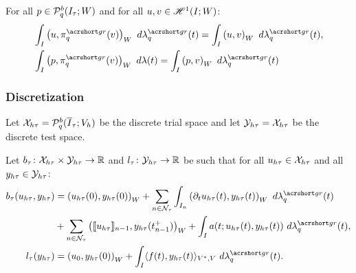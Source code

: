 \begin{proposition}
    For all $p \in \mathcal{P}_{q}^b(I_{\tau}; W)$ and for all $u, v \in \mathscr{H}^{1}(I; W)$:
    \begin{align}
        & \int_I \left( u, \InterpolantGR_q(v) \right)_W ~ d \lambdaGR_q(t) = \int_I \left( u, v \right)_W ~ d \lambdaGR_q(t), \\
        & \int_I \left( p, \InterpolantGR_q(v) \right)_W ~ d \lambda(t) = \int_I \left( p, v \right)_W ~ d \lambdaGR_q(t)
    \end{align}
\end{proposition}

\subsubsection{Discretization}

\begin{definition}
    Let $\mathcal{X}_{h \tau} = \mathcal{P}_{q}^b(\overline{I}_{\tau}; V_h)$ be the discrete trial space and let $\mathcal{Y}_{h \tau} = \mathcal{X}_{h \tau}$ be the discrete test space.
\end{definition}

\begin{definition}
    Let $b_{\tau} \colon \mathcal{X}_{h \tau} \times \mathcal{Y}_{h \tau} \rightarrow \mathbb{R}$ and $l_{\tau} \colon \mathcal{Y}_{h \tau} \rightarrow \mathbb{R}$ be such that for all $u_{h \tau} \in \mathcal{X}_{h \tau}$ and all $y_{h \tau} \in \mathcal{Y}_{h \tau}$:
    \begin{align}
        b_{\tau}(u_{h \tau}, y_{h \tau}) & = \left( u_{h \tau}(0), y_{h \tau}(0) \right)_W + \sum_{n \in \TimeIndices} \int_{I_n} \left( \partial_t u_{h \tau}(t), y_{h \tau}(t) \right)_W ~ d \lambdaGR_q(t) \\
        & + \sum_{n \in \TimeIndices} \left( \llbracket u_{h \tau} \rrbracket_{n - 1}, y_{h \tau}(t_{n - 1}^+) \right)_W + \int_I a(t; u_{h \tau}(t), y_{h \tau}(t)) ~ d \lambdaGR_q(t), \notag \\
        l_{\tau}(y_{h \tau}) & = \left( u_0, y_{h \tau}(0) \right)_W + \int_I \langle f(t), y_{h \tau}(t) \rangle_{V^*, V} ~ d \lambdaGR_q(t).
    \end{align}
\end{definition}

